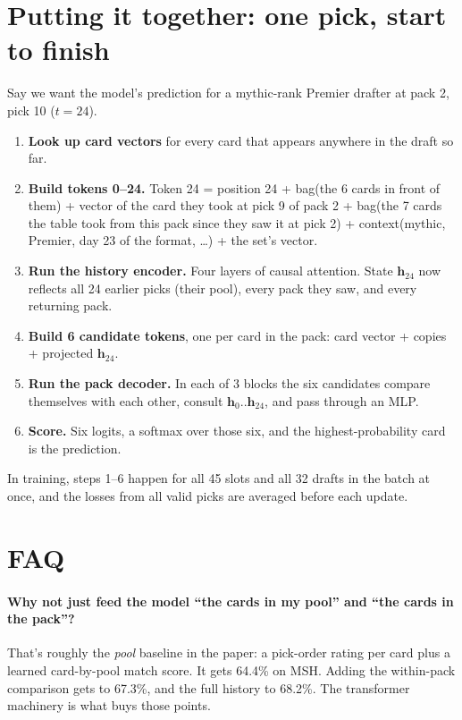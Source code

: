 \documentclass[11pt,letterpaper]{article}
\begin{document}
\section{Putting it together: one pick, start to finish}

Say we want the model's prediction for a mythic-rank Premier drafter at pack 2, pick 10 ($t=24$).

\begin{enumerate}
\item \textbf{Look up card vectors} for every card that appears anywhere in the draft so far.
\item \textbf{Build tokens 0--24.} Token 24 = position 24 + bag(the 6 cards in front of them) + vector of
the card they took at pick 9 of pack 2 + bag(the 7 cards the table took from this pack since they saw it at
pick 2) + context(mythic, Premier, day 23 of the format, \ldots) + the set's vector.
\item \textbf{Run the history encoder.} Four layers of causal attention. State $\mathbf{h}_{24}$ now
reflects all 24 earlier picks (their pool), every pack they saw, and every returning pack.
\item \textbf{Build 6 candidate tokens}, one per card in the pack: card vector + copies + projected
$\mathbf{h}_{24}$.
\item \textbf{Run the pack decoder.} In each of 3 blocks the six candidates compare themselves with each
other, consult $\mathbf{h}_0..\mathbf{h}_{24}$, and pass through an MLP.
\item \textbf{Score.} Six logits, a softmax over those six, and the highest-probability card is the
prediction.
\end{enumerate}

In training, steps 1--6 happen for all 45 slots and all 32 drafts in the batch at once, and the losses
from all valid picks are averaged before each update.

\section{FAQ}

\paragraph{Why not just feed the model ``the cards in my pool'' and ``the cards in the pack''?} That's
roughly the \emph{pool} baseline in the paper: a pick-order rating per card plus a learned card-by-pool
match score. It gets 64.4\% on MSH. Adding the within-pack comparison gets to 67.3\%, and the full history
to 68.2\%. The transformer machinery is what buys those points.
\end{document}
